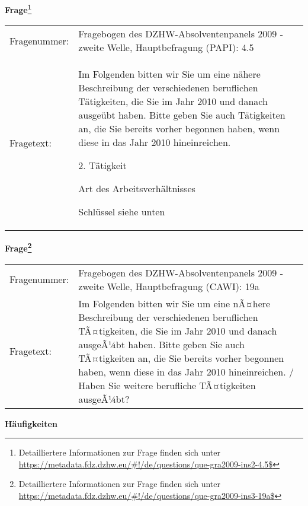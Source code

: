				\vspace*{0.5cm}
                \noindent\textbf{Frage\footnote{Detailliertere Informationen zur Frage finden sich unter
		              \url{https://metadata.fdz.dzhw.eu/\#!/de/questions/que-gra2009-ins2-4.5$}}}\\
				\begin{tabularx}{\hsize}{@{}lX}
					Fragenummer: &
					  Fragebogen des DZHW-Absolventenpanels 2009 - zweite Welle, Hauptbefragung (PAPI):
					  4.5
 \\
					Fragetext: & Im Folgenden bitten wir Sie um eine nähere Beschreibung der verschiedenen beruflichen Tätigkeiten, die Sie im Jahr 2010 und danach ausgeübt haben. Bitte geben Sie auch Tätigkeiten an, die Sie bereits vorher begonnen haben, wenn diese in das Jahr 2010 hineinreichen.\par  2. Tätigkeit\par  Art des Arbeitsverhältnisses\par  Schlüssel siehe unten \\
				\end{tabularx}
				\vspace*{0.5cm}
                \noindent\textbf{Frage\footnote{Detailliertere Informationen zur Frage finden sich unter
		              \url{https://metadata.fdz.dzhw.eu/\#!/de/questions/que-gra2009-ins3-19a$}}}\\
				\begin{tabularx}{\hsize}{@{}lX}
					Fragenummer: &
					  Fragebogen des DZHW-Absolventenpanels 2009 - zweite Welle, Hauptbefragung (CAWI):
					  19a
 \\
					Fragetext: & Im Folgenden bitten wir Sie um eine nÃ¤here Beschreibung der verschiedenen beruflichen TÃ¤tigkeiten, die Sie im Jahr 2010 und danach ausgeÃ¼bt haben. Bitte geben Sie auch TÃ¤tigkeiten an, die Sie bereits vorher begonnen haben, wenn diese in das Jahr 2010 hineinreichen. / Haben Sie weitere berufliche TÃ¤tigkeiten ausgeÃ¼bt? \\
				\end{tabularx}





        		\vspace*{0.5cm}
                \noindent\textbf{Häufigkeiten}

